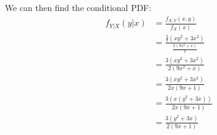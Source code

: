 We can then find the conditional PDF:
\begin{align*}
	f_{Y|X}(y|x) & = \frac{f_{X,Y}(x,y)}{f_X(x)}                        \\
	             & = \frac{\frac{3}{7}(xy^2+3x^2)}{\frac{2(9x^2+x)}{7}} \\
	             & = \frac{3(xy^2+3x^2)}{2(9x^2+x)}                     \\
	             & = \frac{3(xy^2+3x^2)}{2x(9x+1)}                      \\
	             & = \frac{3(x(y^2+3x))}{2x(9x+1)}                      \\
	             & = \frac{3(y^2+3x)}{2(9x+1)}                          \\
\end{align*}
